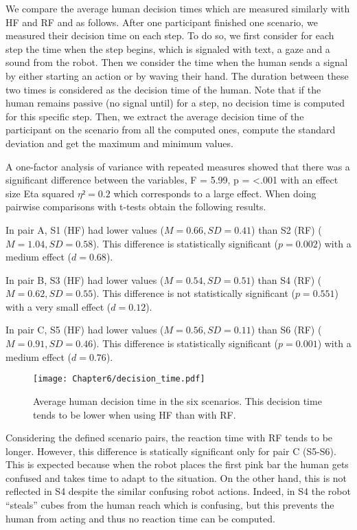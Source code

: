 We compare the average human decision times which are measured similarly with HF and RF and as follows. After one participant finished one scenario, we measured their decision time on each step. To do so, we first consider for each step the time when the step begins, which is signaled with text, a gaze and a sound from the robot. Then we consider the time when the human sends a signal by either starting an action or by waving their hand. The duration between these two times is considered as the decision time of the human. Note that if the human remains passive (no signal until) for a step, no decision time is computed for this specific step. Then, we extract the average decision time of the participant on the scenario from all the computed ones, compute the standard deviation and get the maximum and minimum values. 

A one-factor analysis of variance with repeated measures showed that there was a significant difference between the variables, F = 5.99, p = <.001 with an effect size Eta squared $\eta² = 0.2$ which corresponds to a large effect.
When doing pairwise comparisons with t-tests obtain the following results.

In pair A, S1 (HF) had lower values ($M=0.66, SD=0.41$) than S2 (RF) ($M=1.04, SD=0.58$). This difference is statistically significant ($p=0.002$) with a medium effect ($d=0.68$).

In pair B, S3 (HF) had lower values ($M=0.54, SD=0.51$) than S4 (RF) ($M=0.62, SD=0.55$). This difference is not statistically significant ($p=0.551$) with a very small effect ($d=0.12$).

In pair C, S5 (HF) had lower values ($M=0.56, SD=0.11$) than S6 (RF) ($M=0.91, SD=0.46$). This difference is statistically significant ($p=0.001$) with a medium effect ($d=0.76$).

\begin{figure}
    \center
    \texttt{[image: Chapter6/decision\_time.pdf]}
    \caption{Average human decision time in the six scenarios. This decision time tends to be lower when using HF than with RF.}
    \label{fig:decision_time}
\end{figure}

Considering the defined scenario pairs, the reaction time with RF tends to be longer. However, this difference is statically significant only for pair C (S5-S6). This is expected because when the robot places the first pink bar the human gets confused and takes time to adapt to the situation. On the other hand, this is not reflected in S4 despite the similar confusing robot actions. Indeed, in S4 the robot ``steals'' cubes from the human reach which is confusing, but this prevents the human from acting and thus no reaction time can be computed.  

